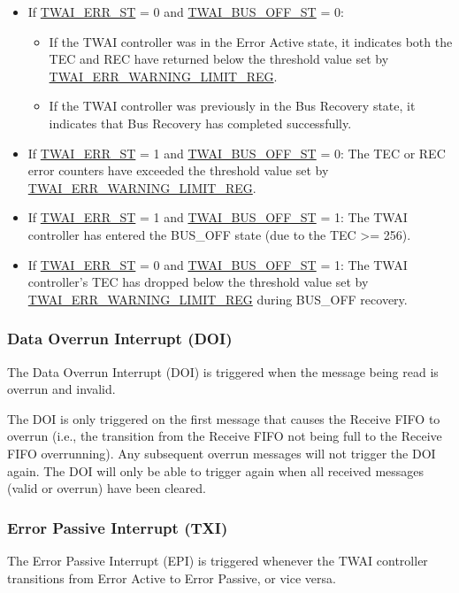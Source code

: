 \documentclass[main\_\_EN.tex]{subfiles}
\begin{document}
\begin{itemize}
    \item If \hyperref[fielddesc:TWAIERRST]{TWAI\_ERR\_ST} = 0 and \hyperref[fielddesc:TWAIBUSOFFST]{TWAI\_BUS\_OFF\_ST} = 0:
    \begin{itemize}
        \item If the TWAI controller was in the Error Active state, it indicates both the TEC and REC have returned below the threshold value set by \hyperref[regdesc:TWAIERRWARNINGLIMITREG]{TWAI\_ERR\_WARNING\_LIMIT\_REG}.
        \item If the TWAI controller was previously in the Bus Recovery state, it indicates that Bus Recovery has completed successfully.
    \end{itemize}
    \item If \hyperref[fielddesc:TWAIERRST]{TWAI\_ERR\_ST} = 1 and \hyperref[fielddesc:TWAIBUSOFFST]{TWAI\_BUS\_OFF\_ST} = 0: The TEC or REC error counters have exceeded the threshold value set by  \hyperref[regdesc:TWAIERRWARNINGLIMITREG]{TWAI\_ERR\_WARNING\_LIMIT\_REG}.
    \item If  \hyperref[fielddesc:TWAIERRST]{TWAI\_ERR\_ST} = 1 and \hyperref[fielddesc:TWAIBUSOFFST]{TWAI\_BUS\_OFF\_ST} = 1: The TWAI controller has entered the BUS\_OFF state (due to the TEC >= 256).
    \item If  \hyperref[fielddesc:TWAIERRST]{TWAI\_ERR\_ST} = 0 and \hyperref[fielddesc:TWAIBUSOFFST]{TWAI\_BUS\_OFF\_ST} = 1: The TWAI controller’s TEC has dropped below the threshold value set by \hyperref[regdesc:TWAIERRWARNINGLIMITREG]{TWAI\_ERR\_WARNING\_LIMIT\_REG} during BUS\_OFF recovery.
\end{itemize}

\subsubsection{Data Overrun Interrupt (DOI)}
The Data Overrun Interrupt (DOI) is triggered when the message being read is overrun and invalid.

The DOI is only triggered on the first message that causes the Receive FIFO to overrun (i.e., the transition from the Receive FIFO not being full to the Receive FIFO overrunning). Any subsequent overrun messages will not trigger the DOI again. The DOI will only be able to trigger again when all received messages (valid or overrun) have been cleared.


\subsubsection{Error Passive Interrupt (TXI)}
The Error Passive Interrupt (EPI) is triggered whenever the TWAI controller transitions from Error Active to Error Passive, or vice versa.
\end{document}
